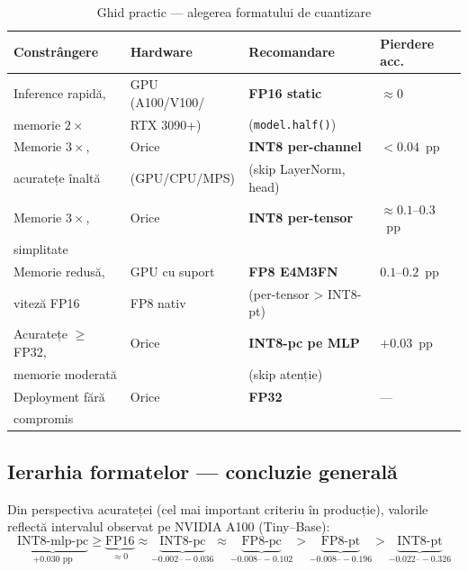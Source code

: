 \documentclass[12pt,a4paper]{article}
\begin{document}
\begin{table}[H]
  \centering
  \caption{Ghid practic --- alegerea formatului de cuantizare}
  \small
  \begin{tabular}{p{3.5cm}p{3.5cm}p{4cm}l}
    \toprule
    \textbf{Constrângere} & \textbf{Hardware} &
    \textbf{Recomandare} & \textbf{Pierdere acc.} \\
    \midrule
    Inference rapidă, & GPU (A100/V100/ & \textbf{FP16 static} &
      $\approx 0$ \\
    memorie $2\times$ & RTX 3090+) & (\texttt{model.half()}) & \\
    \addlinespace
    Memorie $3\times$, & Orice & \textbf{INT8 per-channel} &
      $< 0.04$~pp \\
    acuratețe înaltă & (GPU/CPU/MPS) & (skip LayerNorm, head) & \\
    \addlinespace
    Memorie $3\times$, & Orice & \textbf{INT8 per-tensor} &
      $\approx 0.1$--$0.3$~pp \\
    simplitate & & & \\
    \addlinespace
    Memorie redusă, & GPU cu suport & \textbf{FP8 E4M3FN} &
      $0.1$--$0.2$~pp \\
    viteză FP16 & FP8 nativ & (per-tensor > INT8-pt) & \\
    \addlinespace
    Acuratețe $\geq$ FP32, & Orice & \textbf{INT8-pc pe MLP} &
      $+0.03$~pp \\
    memorie moderată & & (skip atenție) & \\
    \addlinespace
    Deployment fără & Orice & \textbf{FP32} &
      --- \\
    compromis & & & \\
    \bottomrule
  \end{tabular}
  \label{tab:guide}
\end{table}

\subsection{Ierarhia formatelor --- concluzie generală}

Din perspectiva acurateței (cel mai important criteriu în producție),
valorile reflectă intervalul observat pe NVIDIA A100 (Tiny--Base):
{\small\[
  \underbrace{\text{INT8-mlp-pc}}_{\text{+0.030 pp}} \geq
  \underbrace{\text{FP16}}_{\approx 0} \approx
  \underbrace{\text{INT8-pc}}_{-0.002\text{--}-0.036} \approx
  \underbrace{\text{FP8-pc}}_{-0.008\text{--}-0.102} >
  \underbrace{\text{FP8-pt}}_{-0.008\text{--}-0.196} >
  \underbrace{\text{INT8-pt}}_{-0.022\text{--}-0.326}
\]}
\end{document}

